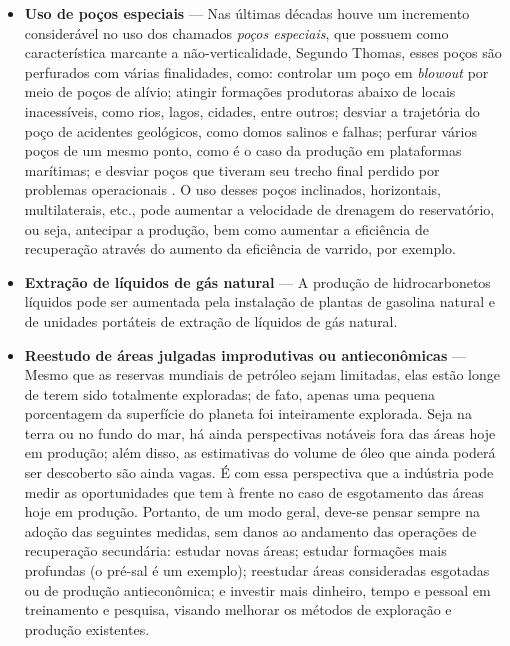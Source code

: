 \begin{itemize}
\item \textbf{Uso de po\c{c}os especiais} --- Nas \'{u}ltimas d\'{e}cadas houve um incremento consider\'{a}vel no uso dos chamados \textit{po\c{c}os especiais}, que possuem como caracter\'{i}stica marcante a n\~{a}o-verticalidade, Segundo Thomas, esses po\c{c}os s\~{a}o perfurados com v\'{a}rias finalidades, como: controlar um po\c{c}o em \textit{blowout} por meio de po\c{c}os de al\'{i}vio; atingir forma\c{c}\~{o}es produtoras abaixo de locais inacess\'{i}veis, como rios, lagos, cidades, entre outros; desviar a trajet\'{o}ria do po\c{c}o de acidentes geol\'{o}gicos, como domos salinos e falhas; perfurar v\'{a}rios po\c{c}os de um mesmo ponto, como \'{e} o caso da produ\c{c}\~{a}o em plataformas mar\'{i}timas; e desviar po\c{c}os que tiveram seu trecho final perdido por problemas operacionais \cite[p. 106]{engpetro}. O uso desses po\c{c}os inclinados, horizontais, multilaterais, etc., pode aumentar a velocidade de drenagem do reservat\'{o}rio, ou seja, antecipar a produ\c{c}\~{a}o, bem como aumentar a efici\^{e}ncia de recupera\c{c}\~{a}o atrav\'{e}s do aumento da efici\^{e}ncia de varrido, por exemplo.
\item \textbf{Extra\c{c}\~{a}o de l\'{i}quidos de g\'{a}s natural} --- A produ\c{c}\~{a}o de hidrocarbonetos l\'{i}quidos pode ser aumentada pela instala\c{c}\~{a}o de plantas de gasolina natural e de unidades port\'{a}teis de extra\c{c}\~{a}o de l\'{i}quidos de g\'{a}s natural.
\item \textbf{Reestudo de \'{a}reas julgadas improdutivas ou antiecon\^{o}micas} --- Mesmo que as reservas mundiais de petr\'{o}leo sejam limitadas, elas est\~{a}o longe de terem sido totalmente exploradas; de fato, apenas uma pequena porcentagem da superf\'{i}cie do planeta foi inteiramente explorada. Seja na terra ou no fundo do mar, h\'{a} ainda perspectivas not\'{a}veis fora das \'{a}reas hoje em produ\c{c}\~{a}o; al\'{e}m disso, as estimativas do volume de \'{o}leo que ainda poder\'{a} ser descoberto s\~{a}o ainda vagas. \'{E} com essa perspectiva que a ind\'{u}stria pode medir as oportunidades que tem \`{a} frente no caso de esgotamento das \'{a}reas hoje em produ\c{c}\~{a}o. Portanto, de um modo geral, deve-se pensar sempre na ado\c{c}\~{a}o das seguintes medidas, sem danos ao andamento das opera\c{c}\~{o}es de recupera\c{c}\~{a}o secund\'{a}ria: estudar novas \'{a}reas; estudar forma\c{c}\~{o}es mais profundas (o pr\'{e}-sal \'{e} um exemplo); reestudar \'{a}reas consideradas esgotadas ou de produ\c{c}\~{a}o antiecon\^{o}mica; e investir mais dinheiro, tempo e pessoal em treinamento e pesquisa, visando melhorar os m\'{e}todos de explora\c{c}\~{a}o e produ\c{c}\~{a}o existentes.
\end{itemize}


